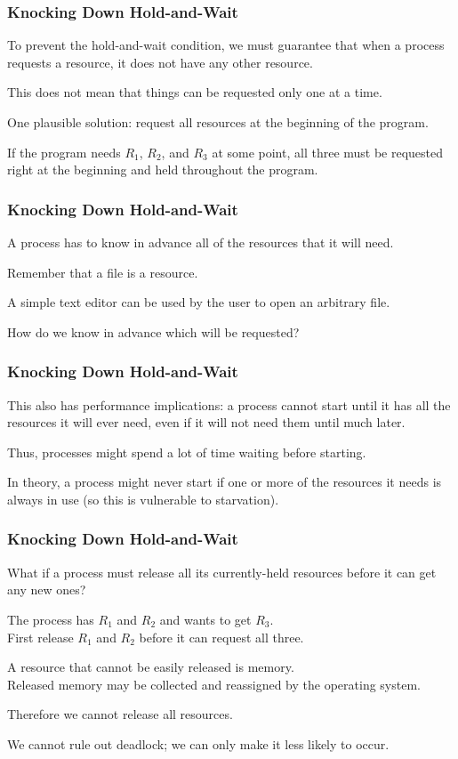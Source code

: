 \begin{frame}
\frametitle{Knocking Down Hold-and-Wait}
 To prevent the hold-and-wait condition, we must guarantee that when a process requests a resource, it does not have any other resource. 
 
This does not mean that things can be requested only one at a time.

One plausible solution: request all resources at the beginning of the program.

If the program needs $R_{1}$, $R_{2}$, and $R_{3}$ at some point, all three must be requested right at the beginning and held throughout the program.

\end{frame}

\begin{frame}
\frametitle{Knocking Down Hold-and-Wait}

A process has to know in advance all of the resources that it will need. 

Remember that a file is a resource. 

A simple text editor can be used by the user to open an arbitrary file. 

How do we know in advance which will be requested?

\end{frame}

\begin{frame}
\frametitle{Knocking Down Hold-and-Wait}

This also has performance implications: a process cannot start until it has all the resources it will ever need, even if it will not need them until much later. 

Thus, processes might spend a lot of time waiting before starting.

In theory, a process might never start if one or more of the resources it needs is always in use (so this is vulnerable to starvation).


\end{frame}

\begin{frame}
\frametitle{Knocking Down Hold-and-Wait}

What if a process must release all its currently-held resources before it can get any new ones? 

The process has $R_{1}$ and $R_{2}$ and wants to get $R_{3}$.\\
\quad First release $R_{1}$ and $R_{2}$ before it can request all three. 

A resource that cannot be easily released is memory.\\
\quad Released memory may be collected and reassigned by the operating system. 

Therefore we cannot release all resources.

We cannot rule out deadlock; we can only make it less likely to occur.

\end{frame}

